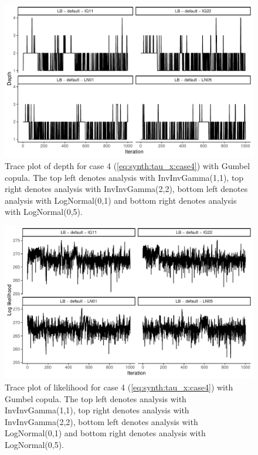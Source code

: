 \documentclass{amsart}
\begin{document}
\begin{figure}
	\centering
	\includegraphics[width = 0.75\linewidth]{trace_case4_gumbel_depth.pdf}
	\caption{Trace plot of depth for case 4 (\cref{eq:synth:tau_x:case4}) with Gumbel copula. The top left denotes analysis with InvInvGamma(1,1), top right denotes analysis with InvInvGamma(2,2), bottom left denotes analysis with LogNormal(0,1) and bottom right denotes analysis with LogNormal(0,5).}
	\label{fig:case4:gumbel:depth}
\end{figure}

\begin{figure}
	\centering
	\includegraphics[width = 0.75\linewidth]{trace_case4_gumbel_like.pdf}
	\caption{Trace plot of likelihood for case 4 (\cref{eq:synth:tau_x:case4}) with Gumbel copula. The top left denotes analysis with InvInvGamma(1,1), top right denotes analysis with InvInvGamma(2,2), bottom left denotes analysis with LogNormal(0,1) and bottom right denotes analysis with LogNormal(0,5).}
	\label{fig:case4:gumbel:like}
\end{figure}





\end{document}
